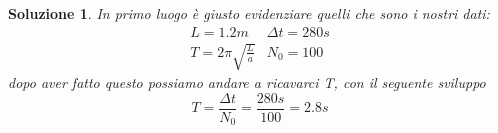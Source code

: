 \documentclass{article}
\newtheorem{sol}{Soluzione}[section]
\begin{document}
\begin{sol}
  In primo luogo è giusto evidenziare quelli che sono i nostri dati:
  \begin{equation*}
    \begin{matrix}
      L=1.2m & \Delta t=280s\\
      T=2\pi \sqrt{\frac{L}{a}}& N_0=100
    \end{matrix}
  \end{equation*}
  dopo aver fatto questo possiamo andare a ricavarci T, con il seguente sviluppo
  \begin{equation*}
    T=\frac{\Delta t}{N_0}=\frac{280s}{100}=2.8s
  \end{equation*}
  
\end{sol}
\end{document}
